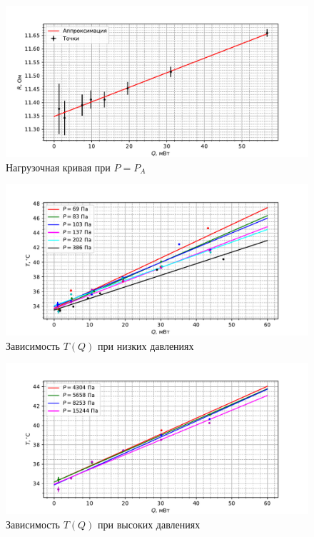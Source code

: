 \documentclass[12pt]{article}
\begin{document}
    \begin{figure}[H]
        \centering
        \includegraphics[width=\textwidth]{graphs/QR.pdf}
        \caption{Нагрузочная кривая при $P = P_A$}
        \label{fig:load_curve}
    \end{figure}

    \begin{figure}[H]
        \centering
        \includegraphics[width=\textwidth]{graphs/QT_lowpress.pdf}
        \caption{Зависимость $T(Q)$ при низких давлениях}
        \label{fig:lowpress}
    \end{figure}

    \begin{figure}[H]
        \centering
        \includegraphics[width=\textwidth]{graphs/QT_highpress.pdf}
        \caption{Зависимость $T(Q)$ при высоких давлениях}
        \label{fig:highpress}
    \end{figure}
\end{document}
